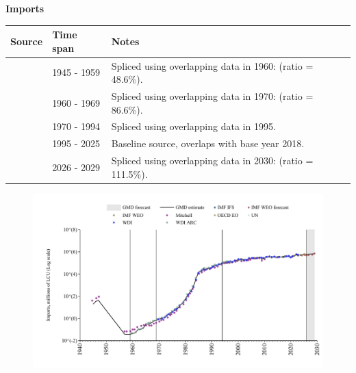 \documentclass[12pt,a4paper,landscape]{article}
\begin{document}
\begin{adjustbox}{max totalsize={\paperwidth}{\paperheight},center}
\begin{minipage}[t][\textheight][t]{\textwidth}
\vspace*{0.5cm}
{}
\begin{center}
{\Large\bfseries Imports}
\end{center}
\vspace{0.5cm}
\begin{table}[H]
\centering
\small
\begin{tabular}{|l|l|l|}
\hline
\textbf{Source} & \textbf{Time span} & \textbf{Notes} \\
\hline
\rowcolor{white}\cite{Mitchell}& 1945 - 1959 &Spliced using overlapping data in 1960: (ratio = 48.6\%). \\
\rowcolor{lightgray}\cite{WDI_ARC}& 1960 - 1969 &Spliced using overlapping data in 1970: (ratio = 86.6\%). \\
\rowcolor{white}\cite{WDI}& 1970 - 1994 &Spliced using overlapping data in 1995. \\
\rowcolor{lightgray}\cite{OECD_EO}& 1995 - 2025 &Baseline source, overlaps with base year 2018. \\
\rowcolor{white}\cite{IMF_WEO_forecast}& 2026 - 2029 &Spliced using overlapping data in 2030: (ratio = 111.5\%). \\
\hline
\end{tabular}
\end{table}
\begin{figure}[H]
\centering
\includegraphics[width=\textwidth,height=0.6\textheight,keepaspectratio]{graphs/ISR_imports.pdf}
\end{figure}
\end{minipage}
\end{adjustbox}
\end{document}
